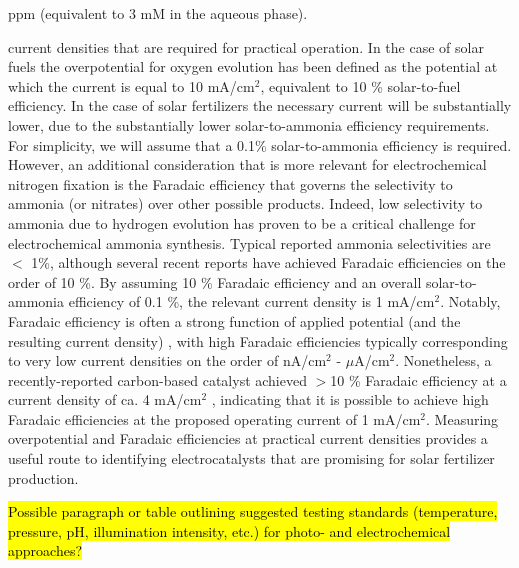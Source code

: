 ppm\cite{Leonardos_1969} (equivalent to 3 mM in the aqueous phase).


current densities that are required for practical operation. In the case of solar fuels the overpotential for oxygen evolution has been defined as the potential at which the current is equal to 10 mA/cm$^2$, equivalent to 10 \% solar-to-fuel efficiency. In the case of solar fertilizers the necessary current will be substantially lower, due to the substantially lower solar-to-ammonia efficiency requirements. For simplicity, we will assume that a 0.1\% solar-to-ammonia efficiency is required. However, an additional consideration that is more relevant for electrochemical nitrogen fixation is the Faradaic efficiency that governs the selectivity to ammonia (or nitrates) over other possible products. Indeed, low selectivity to ammonia due to hydrogen evolution has proven to be a critical challenge for electrochemical ammonia synthesis.\cite{Singh_2017} Typical reported ammonia selectivities are $<$ 1\%, although several recent reports have achieved Faradaic efficiencies on the order of 10 \%. By assuming 10 \% Faradaic efficiency and an overall solar-to-ammonia efficiency of 0.1 \%, the relevant current density is 1 mA/cm$^2$. Notably, Faradaic efficiency is often a strong function of applied potential (and the resulting current density) \needcite, with high Faradaic efficiencies typically corresponding to very low current densities on the order of nA/cm$^2$ - $\mu$A/cm$^2$. Nonetheless, a recently-reported carbon-based catalyst achieved $>$10 \% Faradaic efficiency at a current density of ca. 4 mA/cm$^2$ \needcite, indicating that it is possible to achieve high Faradaic efficiencies at the proposed operating current of 1 mA/cm$^2$. Measuring overpotential and Faradaic efficiencies at practical current densities provides a useful route to identifying electrocatalysts that are promising for solar fertilizer production.

\hl{Possible paragraph or table outlining suggested testing standards (temperature, pressure, pH, illumination intensity, etc.) for photo- and electrochemical approaches?}